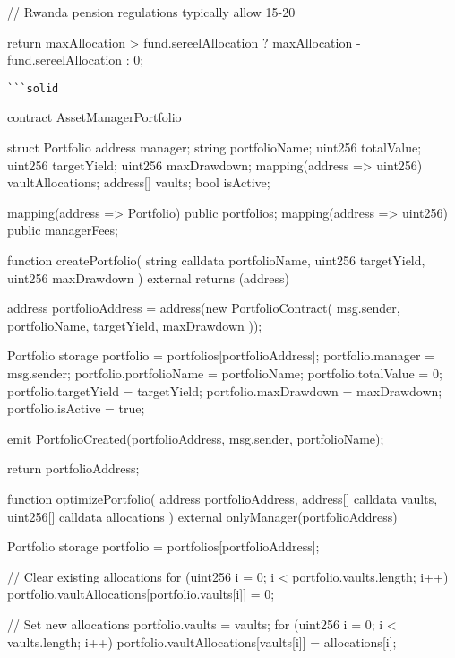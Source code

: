 \documentclass[12pt]{article}
\begin{document}
{{{        // Rwanda pension regulations typically allow 15-20%

        return maxAllocation > fund.sereelAllocation ? maxAllocation - fund.sereelAllocation : 0;    }}

\begin{lstlisting}
```solid
\end{lstlisting}
contract AssetManagerPortfolio {    struct Portfolio {        address manager;        string portfolioName;        uint256 totalValue;        uint256 targetYield;        uint256 maxDrawdown;        mapping(address => uint256) vaultAllocations;        address[] vaults;        bool isActive;    }

    mapping(address => Portfolio) public portfolios;    mapping(address => uint256) public managerFees;

    function createPortfolio(        string calldata portfolioName,        uint256 targetYield,        uint256 maxDrawdown    ) external returns (address) {        address portfolioAddress = address(new PortfolioContract(            msg.sender,            portfolioName,            targetYield,            maxDrawdown        ));

        Portfolio storage portfolio = portfolios[portfolioAddress];        portfolio.manager = msg.sender;        portfolio.portfolioName = portfolioName;        portfolio.totalValue = 0;        portfolio.targetYield = targetYield;        portfolio.maxDrawdown = maxDrawdown;        portfolio.isActive = true;

        emit PortfolioCreated(portfolioAddress, msg.sender, portfolioName);

        return portfolioAddress;    }

    function optimizePortfolio(        address portfolioAddress,        address[] calldata vaults,        uint256[] calldata allocations    ) external onlyManager(portfolioAddress) {        Portfolio storage portfolio = portfolios[portfolioAddress];

        // Clear existing allocations        for (uint256 i = 0; i < portfolio.vaults.length; i++) {            portfolio.vaultAllocations[portfolio.vaults[i]] = 0;        }

        // Set new allocations        portfolio.vaults = vaults;        for (uint256 i = 0; i < vaults.length; i++) {            portfolio.vaultAllocations[vaults[i]] = allocations[i];        }

}}}
\end{document}
